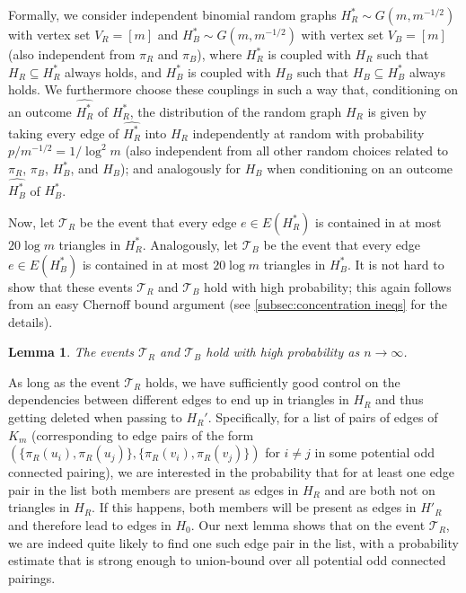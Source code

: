 \documentclass[11pt,reqno,oneside]{amsart}
\newtheorem{lemma}[theorem]{Lemma}
\theoremstyle{definition}
\newcommand\margindef[1]{\marginpar{\textcolor{gray!70!black}{\scriptsize #1}}}
\newcommand\wh[1]{\widehat{#1}}
\newcommand\1{\mathbf{1}}
\newcommand{\su}{\subseteq}
\begin{document}
Formally, we consider independent binomial random graphs\margindef{{$H^*_R, H^*_B$}} $H^*_R\sim G(m,m^{-1/2})$ with vertex set $V_R=[m]$ and $H^*_B\sim G(m,m^{-1/2})$ with vertex set $V_B=[m]$ (also independent from $\pi_R$ and $\pi_B$), where $H^*_R$ is coupled with $H_R$ such that $H_R\su H^*_R$ always holds, and $H^*_B$ is coupled with $H_B$ such that $H_B\su H^*_B$ always holds. We furthermore choose these couplings in such a way that, conditioning on an outcome $\wh{H_R^*}$ of $H_R^*$, the distribution of the random graph $H_R$ is given by taking every edge of $\wh{H_R^*}$ into $H_R$ independently at random with probability $p/m^{-1/2}=1/{\log^{2}m}$ (also independent from all other random choices related to $\pi_R$, $\pi_B$, $H^*_B$, and $H_B$); and analogously for $H_B$ when conditioning on an outcome $\wh{H_B^*}$ of $H_B^*$.

Now, let \margindef{{$\mathcal T_R, \mathcal T_B$}} $\mathcal T_R$ be the event that every edge $e\in E(H_R^*)$ is contained in at most $20\log m$ triangles in $H_R^*$. Analogously, let $\mathcal T_B$ be the event that every edge $e\in E(H_B^*)$ is contained in at most $20\log m$ triangles in $H_B^*$. It is not hard to show that these events $\mathcal T_R$ and  $\mathcal T_B$ hold with high probability; this again follows from an easy Chernoff bound argument (see \cref{subsec:concentration ineqs} for the details).

\begin{lemma}\label{lem:easy chernoff triangles}
	The events $\mathcal T_R$ and $\mathcal T_B$ hold with high probability as $n \to \infty$.
\end{lemma}

As long as the event $\mathcal T_R$ holds, we have sufficiently good control on the dependencies between different edges to end up in triangles in $H_R$ and thus getting deleted when passing to $H_R'$. Specifically, for a list of pairs of edges of $K_m$ (corresponding to edge pairs of the form $(\{\pi_R(u_i),\pi_R(u_j)\},\{\pi_R(v_i),\pi_R(v_j)\})$ for $i\neq j$ in some potential odd connected pairing), we are interested in the probability that for at least one edge pair in the list both members are present as edges in $H_R$ and are both not on triangles in $H_R$. If this happens, both members will be present as edges in $H'_R$ and therefore lead to edges in $H_0$. Our next lemma shows that on the event $\mathcal T_R$, we are indeed quite likely to find one such edge pair in the list, with a probability estimate that is strong enough to union-bound over all potential odd connected pairings.
\end{document}
